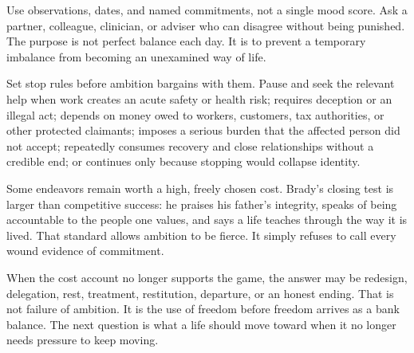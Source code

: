Use observations, dates, and named commitments, not a single mood score. Ask a
partner, colleague, clinician, or adviser who can disagree without being
punished. The purpose is not perfect balance each day. It is to prevent a
temporary imbalance from becoming an unexamined way of life.

Set stop rules before ambition bargains with them. Pause and seek the relevant
help when work creates an acute safety or health risk; requires deception or an
illegal act; depends on money owed to workers, customers, tax authorities, or
other protected claimants; imposes a serious burden that the affected person
did not accept; repeatedly consumes recovery and close relationships without a
credible end; or continues only because stopping would collapse identity.

Some endeavors remain worth a high, freely chosen cost. Brady's closing test is
larger than competitive success: he praises his father's integrity, speaks of
being accountable to the people one values, and says a life teaches through
the way it is lived. That standard allows ambition to be fierce. It simply
refuses to call every wound evidence of commitment.

When the cost account no longer supports the game, the answer may be redesign,
delegation, rest, treatment, restitution, departure, or an honest ending. That
is not failure of ambition. It is the use of freedom before freedom arrives as
a bank balance. The next question is what a life should move toward when it no
longer needs pressure to keep moving.
